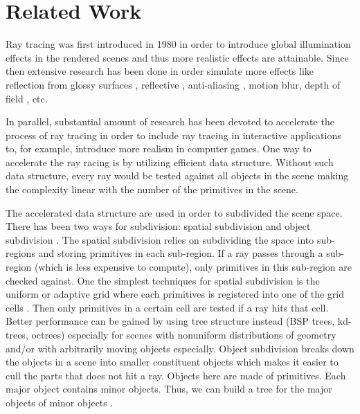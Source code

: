 \section{Related Work}
Ray tracing was first introduced in 1980 \cite{whitted1979improved} in order to introduce global illumination effects in the rendered scenes and thus more realistic effects are attainable. Since then extensive research has been done in order simulate more effects like reflection from glossy surfaces \cite{cook1984distributed, ward1988ray}, reflective \cite{amanatides1984ray}, anti-aliasing \cite{shirley2008realistic,pharr2016physically, cook1984distributed}, motion blur\cite{cook1984distributed, cook1986stochastic}, depth of field \cite{shinya1994post}, etc.

In parallel, substantial amount of research has been devoted to accelerate the process of ray tracing in order to include ray tracing in interactive applications to, for example, introduce more realism in computer games. One way to accelerate the ray racing is by utilizing efficient data structure. Without such data structure, every ray would be tested against all objects in the scene making the complexity linear with the number of the primitives in the scene. 

The accelerated data structure are used in order to subdivided the scene space. There has been two ways for subdivision: spatial subdivision and object subdivision \cite{pharr2016physically}. The spatial subdivision relies on subdividing the space into sub-regions and storing primitives in each sub-region. If a ray passes through a sub-region (which is less expensive to compute), only primitives in this sub-region are checked against. One the simplest techniques for spatial subdivision is the uniform or adaptive grid where each primitives is registered into one of the grid cells \cite{Snyder:1987:RTC:37402.37417}. Then only primitives in a certain cell are tested if a ray hits that cell. Better performance can be gained by using tree structure instead (BSP trees, kd-trees, octrees) especially for scenes with nonuniform distributions of geometry and/or with arbitrarily moving objects especially. Object subdivision breaks down the objects in a scene into smaller constituent objects which makes it easier to cull the parts that does not hit a ray. Objects here are made of primitives. Each major object contains minor objects. Thus, we can build a tree for the major objects of minor objects \cite{Kay:1986:RTC:15886.15916}. 